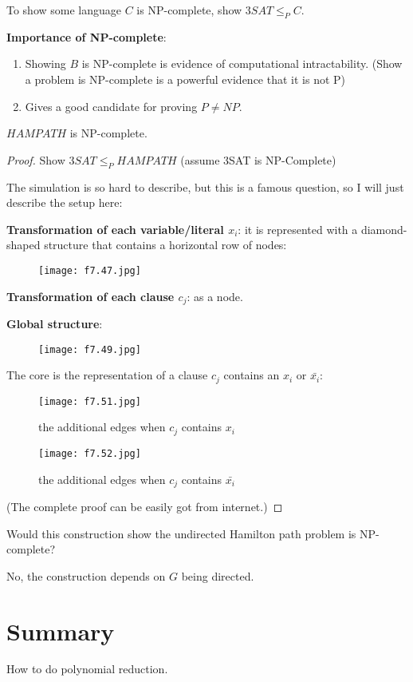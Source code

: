 \begin{note}
    To show some language \(C\) is NP-complete, show \(3SAT \leq_P C\). 
\end{note}


\textbf{Importance of NP-complete}:
\begin{enumerate}
    \item Showing \(B\) is NP-complete is evidence of computational intractability.
    (Show a problem is NP-complete is a powerful evidence that it is not P)
    \item Gives a good candidate for proving \(P \neq NP\).  
\end{enumerate} 

\begin{theorem}
    \(HAMPATH\) is NP-complete. 
\end{theorem}
\begin{proof}
    Show \(3SAT \leq_P HAMPATH\) (assume 3SAT is NP-Complete) 

    The simulation is so hard to describe, but this is a famous question, so I will just describe the setup here:

    \textbf{Transformation of each variable/literal \(x_i\)}: it is represented with a diamond-shaped structure that contains a horizontal row of nodes:
    \begin{figure}[H]
        \centering
        \texttt{[image: f7.47.jpg]}
    \end{figure}

    \textbf{Transformation of each clause \(c_j\)}: as a node. 

    \textbf{Global structure}:
    \begin{figure}[H]
        \centering
        \texttt{[image: f7.49.jpg]}
    \end{figure}

    The core is the representation of a clause \(c_j\) contains an \(x_i\) or \(\bar{x_i}\):
    \begin{figure}[H]
        \begin{minipage}{0.48\textwidth}
            \centering
            \texttt{[image: f7.51.jpg]}
            \caption{the additional edges when \(c_j\) contains \(x_i\) }
        \end{minipage}\hfill
        \begin{minipage}{0.48\textwidth}
            \centering
            \texttt{[image: f7.52.jpg]}
            \caption{the additional edges when \(c_j\) contains \(\bar{x_i}\) }
        \end{minipage}
    \end{figure}

    (The complete proof can be easily got from internet.)
\end{proof}

\begin{remark}
    Would this construction show the undirected Hamilton path problem is NP-complete?

    No, the construction depends on \(G\) being directed. 
\end{remark}

\section{Summary}
How to do polynomial reduction.